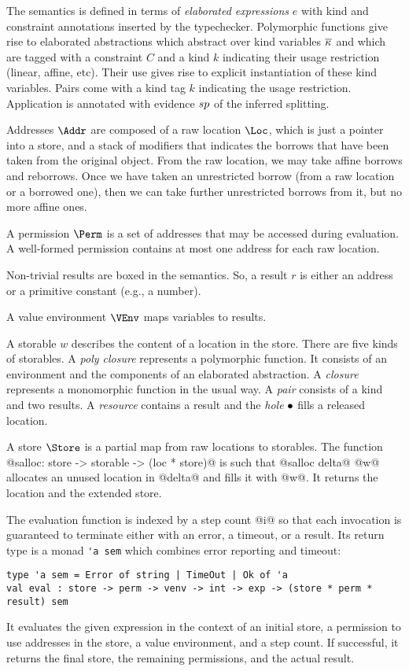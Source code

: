 The semantics is defined in terms of \emph{elaborated expressions} $e$
with kind and constraint annotations inserted by the typechecker.
Polymorphic functions give rise to elaborated
abstractions which abstract over kind variables $\overline{\kappa_{{}}}$ and
which are tagged with a constraint $C$ and a kind $k$ indicating their
usage restriction (linear, affine, etc). Their use
gives rise to explicit instantiation of these kind variables. Pairs
come with a kind tag $k$ indicating the usage restriction. Application
is annotated with evidence $sp$ of the inferred splitting. 

Addresses $\Addr$ are composed of a raw location $\Loc$, which is just
a pointer into a store, and a stack of modifiers that indicates the
borrows that have been taken from the original object. From the raw
location, we may take affine borrows and reborrows. Once we have
taken an unrestricted borrow (from a raw location or a borrowed one),
then we can take further unrestricted borrows from it, but no more
affine ones.

A permission $\Perm$ is a set of addresses that may be accessed during
evaluation. A well-formed permission contains at most one address for each raw
location.

Non-trivial results are boxed in the  semantics. So, a result
$r$ is either an address or a primitive constant (e.g., a number).

A value environment $\VEnv$  maps variables to results.

A storable $w$ describes the content of a location in the store. There are five
kinds of storables. A \emph{poly closure} represents a polymorphic
function. It consists of an environment and the components of an
elaborated abstraction. A \emph{closure} represents a monomorphic
function in the usual way. A \emph{pair}
consists of a kind and two results. A \emph{resource} contains
a result and the \emph{hole} $\bullet$ fills a released location.

A store $\Store$ is a partial map from raw locations to
storables. The function
@salloc: store -> storable -> (loc * store)@ is such that
@salloc delta@ @w@ allocates an unused location in @delta@ and fills it with
@w@. It returns the location and the extended store.


The evaluation function is indexed by a step count @i@ so that each
invocation is guaranteed to terminate either with an error, a timeout,
or a result. Its return type is a monad
\lstinline/'a sem/ which combines error reporting and timeout:
\begin{lstlisting}
type 'a sem = Error of string | TimeOut | Ok of 'a
val eval : store -> perm -> venv -> int -> exp -> (store * perm * result) sem
\end{lstlisting}
It evaluates the given expression in the context of an initial store, a
permission to use addresses in the store, a value environment, and a
step count. If successful, it returns the final store, the remaining
permissions, and the actual result.

